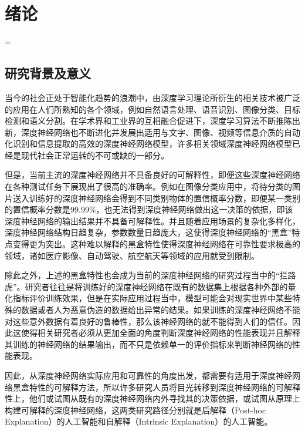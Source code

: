 


\chapter{绪论}
\thispagestyle{others}
\pagestyle{others}
\xiaosi

=\section{研究背景及意义}
当今的社会正处于智能化趋势的浪潮中，由深度学习理论所衍生的相关技术被广泛的应用在人们所熟知的各个领域，例如自然语言处理\textsuperscript{\cite{language}}、语音识别\textsuperscript{\cite{voice}}、图像分类\textsuperscript{\cite{image,simonyan2014very}}、目标检测\textsuperscript{\cite{od1,od2}}和语义分割\textsuperscript{\cite{sg1,sg2}}。在学术界和工业界的互相融合促进下，深度学习算法不断推陈出新，深度神经网络也不断进化并发展出适用与文字、图像、视频等信息介质的自动化识别和信息提取的高效的深度神经网络模型，许多相关领域深度神经网络模型已经是现代社会正常运转的不可或缺的一部分。

但是，当前主流的深度神经网络并不具备良好的可解释性，即便这些深度神经网络在各种测试任务下展现出了很高的准确率。例如在图像分类应用中，将待分类的图片送入训练好的深度神经网络会得到不同类别物体的置信概率分数，即便某一类别的置信概率分数是99.99\%，也无法得到深度神经网络做出这一决策的依据\textsuperscript{\cite{machine}}，即该深度神经网络的输出结果并不具备可解释性。并且随着应用场景的复杂化多样化，深度神经网络结构日趋复杂，参数数量日趋庞大，这使得深度神经网络的“黑盒”特点变得更为突出。这种难以解释的黑盒特性使得深度神经网络在可靠性要求极高的领域，诸如医疗影像、自动驾驶、航空航天\textsuperscript{\cite{arospace}}等领域的应用就受到限制。

除此之外，上述的黑盒特性也会成为当前的深度神经网络的研究过程当中的“拦路虎”。研究者往往是将训练好的深度神经网络在既有的数据集上根据各种外部的量化指标评价训练效果，但是在实际应用过程当中，模型可能会对现实世界中某些特殊的数据或者人为恶意伪造的数据给出异常的结果。如果训练的深度神经网络不能对这些意外数据有着良好的鲁棒性，那么该神经网络的就不能得到人们的信任。因此这使得相关研究者必须从更加全面的角度判断深度神经网络的性能表现并且解释其训练的神经网络的结果输出，而不只是依赖单一的评价指标来判断神经网络的性能表现。

因此，从深度神经网络实际应用和可靠性的角度出发，都需要有适用于深度神经网络黑盒特性的可解释方法，所以许多研究人员将目光转移到深度神经网络的可解释性上，他们或试图从既有的深度神经网络内外寻找其的决策依据，或试图从原理上构建可解释的深度神经网络，这两类研究路径分别就是后解释（Post-hoc Explanation）\textsuperscript{\cite{post,post2}}的人工智能和自解释（Intrinsic Explanation）\textsuperscript{\cite{Intrinsic1,Intrinsic2,Intrinsic3,Intrinsic4,Intrinsic5,Intrinsic6}}的人工智能。

